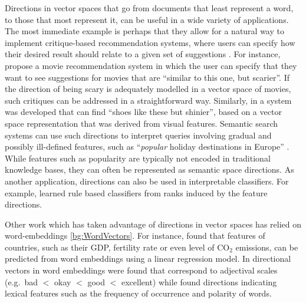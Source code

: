 Directions in vector spaces that go from documents that least represent a word, to those that most represent it, can be useful in a wide variety of applications. The most immediate example is perhaps that they allow for a natural way to implement critique-based recommendation systems, where users can specify how their desired result should relate to a given set of suggestions \cite{Viappiani2006}. For instance, \cite{Vig2014} propose a movie recommendation system in which the user can specify that they want to see suggestions for movies that are ``similar to this one, but scarier''. If the direction of being scary is adequately modelled in a vector space of movies, such critiques can be addressed in a straightforward way. Similarly, in \cite{Kovashka} a system was developed that can find ``shoes like these but shinier'', based on a vector space representation that was derived from visual features. Semantic search systems can use such directions to interpret queries involving gradual and possibly ill-defined features, such as ``\emph{popular} holiday destinations in Europe'' \cite{Jameel}. While features such as popularity are typically not encoded in traditional knowledge bases, they can often be represented as semantic space directions.  As another application, directions can also be used in interpretable classifiers. For example, \cite{Derrac2015} learned rule based classifiers from ranks induced by the feature directions.

Other work which has taken advantage of directions in vector spaces has relied on word-embeddings \ref{bg:WordVectors}. For instance,  \cite{gupta2015distributional} found that features of countries, such as their GDP, fertility rate or even level of CO$_2$ emissions, can be predicted from word embeddings using a linear regression model.   In \cite{kim2013deriving} directional vectors in word embeddings were found that correspond to adjectival scales (e.g.\ bad $<$ okay $<$ good $<$ excellent) while \cite{Rothe2016} found directions indicating lexical features such as the frequency of occurrence and polarity of words.



